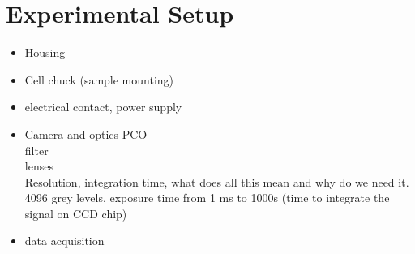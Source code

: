 
\chapter{Experimental Setup}
\begin{itemize}
	\item Housing
	\item Cell chuck (sample mounting)
	\item electrical contact, power supply
	\item Camera and optics
	PCO \\
	filter \\
	lenses \\
	Resolution, integration time, what does all this mean and why do we need it. 4096 grey levels, exposure time from 1 ms to 1000s (time to integrate the signal on CCD chip)
	\item data acquisition
\end{itemize}